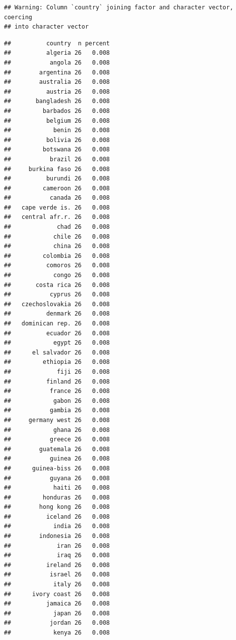 \documentclass[]{gitbook}
\newenvironment{Shaded}{\begin{snugshade}}{\end{snugshade}}
\newcommand{\KeywordTok}[1]{\textcolor[rgb]{0.13,0.29,0.53}{\textbf{#1}}}
\newcommand{\NormalTok}[1]{#1}
\newcommand{\OperatorTok}[1]{\textcolor[rgb]{0.81,0.36,0.00}{\textbf{#1}}}
\newcommand{\StringTok}[1]{\textcolor[rgb]{0.31,0.60,0.02}{#1}}
\begin{document}
\begin{verbatim}
## Warning: Column `country` joining factor and character vector, coercing
## into character vector
\end{verbatim}

\begin{Shaded}
\end{Shaded}

\begin{verbatim}
##          country  n percent
##          algeria 26   0.008
##           angola 26   0.008
##        argentina 26   0.008
##        australia 26   0.008
##          austria 26   0.008
##       bangladesh 26   0.008
##         barbados 26   0.008
##          belgium 26   0.008
##            benin 26   0.008
##          bolivia 26   0.008
##         botswana 26   0.008
##           brazil 26   0.008
##     burkina faso 26   0.008
##          burundi 26   0.008
##         cameroon 26   0.008
##           canada 26   0.008
##   cape verde is. 26   0.008
##   central afr.r. 26   0.008
##             chad 26   0.008
##            chile 26   0.008
##            china 26   0.008
##         colombia 26   0.008
##          comoros 26   0.008
##            congo 26   0.008
##       costa rica 26   0.008
##           cyprus 26   0.008
##   czechoslovakia 26   0.008
##          denmark 26   0.008
##   dominican rep. 26   0.008
##          ecuador 26   0.008
##            egypt 26   0.008
##      el salvador 26   0.008
##         ethiopia 26   0.008
##             fiji 26   0.008
##          finland 26   0.008
##           france 26   0.008
##            gabon 26   0.008
##           gambia 26   0.008
##     germany west 26   0.008
##            ghana 26   0.008
##           greece 26   0.008
##        guatemala 26   0.008
##           guinea 26   0.008
##      guinea-biss 26   0.008
##           guyana 26   0.008
##            haiti 26   0.008
##         honduras 26   0.008
##        hong kong 26   0.008
##          iceland 26   0.008
##            india 26   0.008
##        indonesia 26   0.008
##             iran 26   0.008
##             iraq 26   0.008
##          ireland 26   0.008
##           israel 26   0.008
##            italy 26   0.008
##      ivory coast 26   0.008
##          jamaica 26   0.008
##            japan 26   0.008
##           jordan 26   0.008
##            kenya 26   0.008

\end{verbatim}
\end{document}
